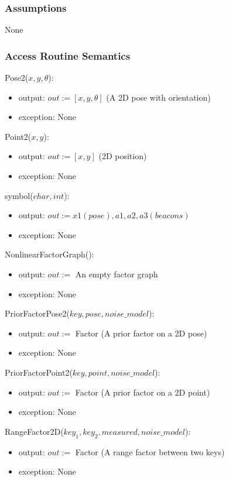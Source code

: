 \documentclass[12pt, titlepage]{article}
\begin{document}
\subsubsection{Assumptions}
None

\subsubsection{Access Routine Semantics}

Pose2($x, y, \theta$):
\begin{itemize}
    \item output: $out:= [x, y, \theta] $ (A 2D pose with orientation)
    \item exception: None
\end{itemize}

\noindent Point2($x, y$):
\begin{itemize}
    \item output: $out:=  [x, y] $ (2D position)
    \item exception: None
\end{itemize}

\noindent symbol($char, int$):
\begin{itemize}
    \item output: $out:= x1(pose), a1, a2, a3(beacons)$
    \item exception: None
\end{itemize}

\noindent NonlinearFactorGraph():
\begin{itemize}
    \item output: $out:=$ An empty factor graph
    \item exception: None
\end{itemize}

\noindent PriorFactorPose2($key, pose, noise\_model$):
\begin{itemize}
    \item output: $out:=$ Factor (A prior factor on a 2D pose)
    \item exception: None
\end{itemize}

\noindent PriorFactorPoint2($key, point, noise\_model$):
\begin{itemize}
    \item output: $out:=$ Factor (A prior factor on a 2D point)
    \item exception: None
\end{itemize}

\noindent RangeFactor2D($key_1, key_2, measured, noise\_model$):
\begin{itemize}
    \item output: $out:=$ Factor (A range factor between two keys)
    \item exception: None
\end{itemize}
\end{document}
